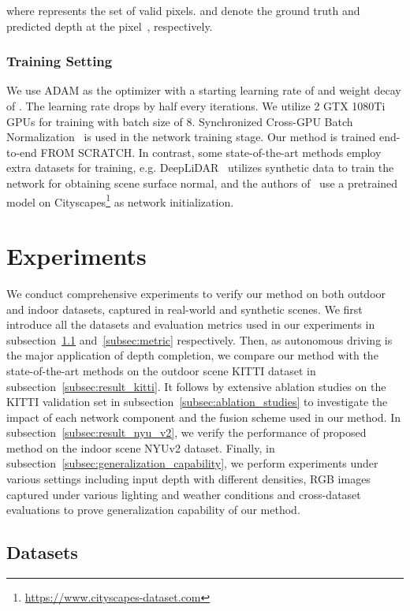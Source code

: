 \documentclass[journal]{IEEEtran}
\begin{document}
where  represents the set of valid pixels.
 and  denote the ground truth and predicted depth at the pixel~, respectively.

\subsubsection{Training Setting}
 We use ADAM\cite{adam} as the optimizer with a starting learning rate of  and weight decay of .
 The learning rate drops by half every  iterations.
 We utilize 2 GTX 1080Ti GPUs for training with batch size of 8.
 Synchronized Cross-GPU Batch Normalization~\cite{batch_norm,pytorch_encoding} is used in the network training stage.
 Our method is trained end-to-end FROM SCRATCH.
 In contrast, some state-of-the-art methods employ extra datasets for training,
 e.g. DeepLiDAR~\cite{deep_lidar} utilizes synthetic data to train the network for obtaining scene surface normal,
 and the authors of~\cite{sparse_noisy} use a pretrained model on Cityscapes\footnote{\url{https://www.cityscapes-dataset.com}} as network initialization.
 

\section{Experiments}

We conduct comprehensive experiments to verify our method on both outdoor and indoor datasets, captured in real-world and synthetic scenes.
We first introduce all the datasets and evaluation metrics used in our experiments in subsection~\ref{subsec:dataset} and~\ref{subsec:metric} respectively.
Then, as autonomous driving is the major application of depth completion,
we compare our method with the state-of-the-art methods on the outdoor scene KITTI dataset in subsection~\ref{subsec:result_kitti}.
It follows by extensive ablation studies on the KITTI validation set in subsection~\ref{subsec:ablation_studies} to investigate the impact of each network component and the fusion scheme used in our method.
In subsection~\ref{subsec:result_nyu_v2}, we verify the performance of proposed method on the indoor scene NYUv2 dataset.
Finally, in subsection~\ref{subsec:generalization_capability}, we perform experiments under various settings including input depth with different densities,
RGB images captured under various lighting and weather conditions and cross-dataset evaluations to prove generalization capability of our method. 


\subsection{Datasets}
\label{subsec:dataset}
\end{document}
